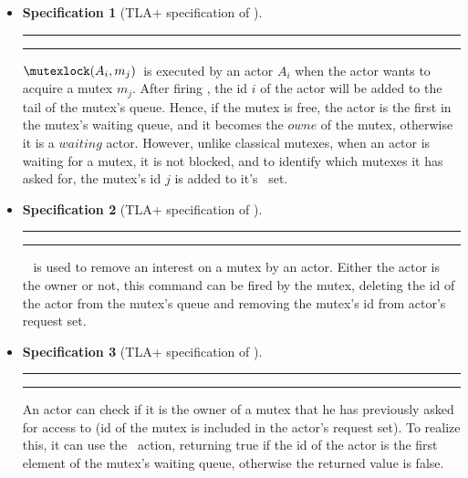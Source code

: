 \documentclass[a4paper,11pt]{article}
\theoremstyle{break}
\newtheorem{TLA}{Specification}
\begin{document}
 \begin{itemize}[noitemsep]
\setlength{\itemsep}{3pt}
\item \mutexlock  
\begin{TLA}[TLA+ specification of \mutexlock]
\par\noindent\rule{\textwidth}{0.4pt}
\begin{tlatex}

\end{tlatex}
\par\noindent\rule{\textwidth}{0.4pt} 
\end{TLA}
$\mutexlock(A_i,m_j)$~is executed by an actor $A_i$ when the actor wants to acquire a mutex $m_j$. After firing \mutexlock, the id $i$ of the actor will be added to the tail of the mutex's queue. Hence, if the mutex is free, the actor is the first in the mutex's waiting queue, and it becomes the $owne$ of the mutex, otherwise it is a $waiting$ actor. However, unlike classical mutexes, when an actor is waiting for a mutex, it is not blocked, and to identify which mutexes it has asked for, the mutex's id $j$ is added to it's \request~set.\\ 
\item \mutexunlock  
\begin{TLA}[TLA+ specification of \mutexunlock]
\par\noindent\rule{\textwidth}{0.4pt}
\begin{tlatex}

\end{tlatex}
\par\noindent\rule{\textwidth}{0.4pt} 
\end{TLA}
 \mutexunlock~ is used to remove an interest on a mutex by an actor. Either the actor is the owner or not, this command can be fired by the mutex, deleting the id of the actor from the mutex's queue and removing the mutex's id from actor's request set.\\
 \item \mutextest

\begin{TLA}[TLA+ specification of \mutextest]
\par\noindent\rule{\textwidth}{0.4pt}

\begin{tlatex}

\end{tlatex}
\par\noindent\rule{\textwidth}{0.4pt} 
\end{TLA}

An actor can check if it is the owner of a mutex that he has previously asked for access to (id of the mutex is included in the actor's request set). To realize this, it can use the \mutextest~action, returning true if the id of the actor is the first element of the mutex's waiting queue, otherwise the returned value is false.\\  


\end{itemize}
\end{document}
